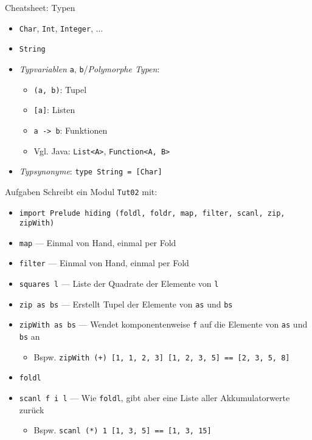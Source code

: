 \documentclass{beamer}
\begin{document}
\begin{frame}{Cheatsheet: Typen}
  \begin{itemize}
    \item \texttt{Char}, \texttt{Int}, \texttt{Integer}, ...
    \item \texttt{String}
    \item \emph{Typvariablen} \texttt{a}, \texttt{b}/\emph{Polymorphe Typen}:
    \begin{itemize}
      \item \texttt{(a, b)}: Tupel
      \item \texttt{[a]}: Listen
      \item \texttt{a -> b}: Funktionen
      \item Vgl. Java: \texttt{List<A>}, \texttt{Function<A, B>}
    \end{itemize}
    \item \emph{Typsynonyme}: \texttt{type String = [Char]}
  \end{itemize}
\end{frame}

\begin{frame}{Aufgaben}
	Schreibt ein Modul \texttt{Tut02} mit:

	\begin{itemize}
		\item \texttt{import Prelude hiding (foldl, foldr, map, filter, scanl, zip, zipWith)}
		\item \texttt{map} --- Einmal von Hand, einmal per Fold
		\item \texttt{filter} --- Einmal von Hand, einmal per Fold
		\item \texttt{squares l} --- Liste der Quadrate der Elemente von \texttt{l}
		\item \texttt{zip as bs} --- Erstellt Tupel der Elemente von \texttt{as} und \texttt{bs}
		\item \texttt{zipWith as bs} --- Wendet komponentenweise \texttt{f} auf die Elemente von \texttt{as} und \texttt{bs} an
		\begin{itemize}
			\item Bspw. \texttt{zipWith (+) [1, 1, 2, 3] [1, 2, 3, 5] == [2, 3, 5, 8]}
		\end{itemize}
   		\pause
		\item \texttt{foldl}
		\item \texttt{scanl f i l} --- Wie \texttt{foldl}, gibt aber eine Liste aller Akkumulatorwerte zurück
		\begin{itemize}
			\item Bspw. \texttt{scanl (*) 1 [1, 3, 5] == [1, 3, 15]}
		\end{itemize}
	\end{itemize}
\end{frame}
\end{document}
